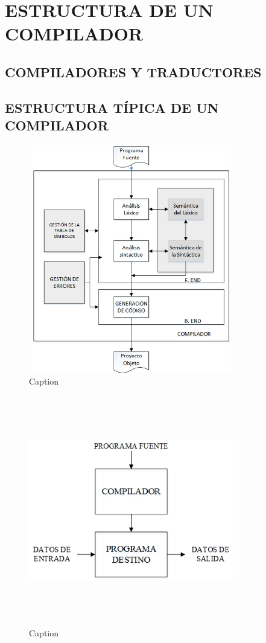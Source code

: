 \chapter{ESTRUCTURA DE UN COMPILADOR}
\section{COMPILADORES Y TRADUCTORES}
\section{ESTRUCTURA TÍPICA DE UN COMPILADOR}
\begin{figure}[H]
    \centering
    \includegraphics[width=0.8\textwidth, height=10cm,keepaspectratio]{chapters/chapter1/figures/Fig1 Estructura del compilador.png}
    \caption{Caption}
    \label{fig:my_label}
\end{figure}

\begin{figure}[H]
    \centering
    \includegraphics[width=0.8\textwidth, height=10cm,keepaspectratio]{chapters/chapter1/figures/Fig2 Flujo Programa.png}
    \caption{Caption}
    \label{fig:my_label}
\end{figure}


